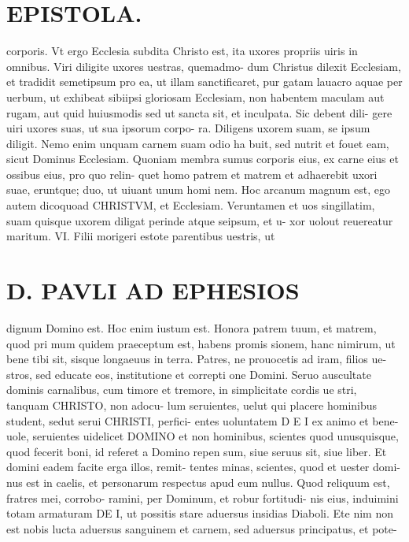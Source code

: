 \documentclass{article}
\begin{document}
\begin{pages}
\section*{EPISTOLA. }
\marginpar{[ p.2 ]}
\marginpar{[ p.10.  ]}
\marginpar{[ p.11.  ]}\pstart corporis. Vt ergo Ecclesia subdita Christo est, ita uxores propriis uiris in omnibus.  \pend\pstart Viri diligite uxores uestras, quemadmo- dum Christus dilexit Ecclesiam, et tradidit semetipsum pro ea, ut illam sanctificaret, pur gatam lauacro aquae per uerbum, ut exhibeat sibiipsi gloriosam Ecclesiam, non habentem maculam aut rugam, aut quid huiusmodis sed ut sancta sit, et inculpata. Sic debent dili- gere uiri uxores suas, ut sua ipsorum corpo- ra. Diligens uxorem suam, se ipsum diligit. Nemo enim unquam carnem suam odio ha buit, sed nutrit et fouet eam, sicut Dominus Ecclesiam.  \pend\pstart Quoniam membra sumus corporis eius, ex carne eius et ossibus eius, pro quo relin- quet homo patrem et matrem et adhaerebit uxori suae, eruntque; duo, ut uiuant unum homi nem. Hoc arcanum magnum est, ego autem dicoquoad CHRISTVM, et Ecclesiam. Veruntamen et uos singillatim, suam quisque uxorem diligat perinde atque seipsum, et u- xor uolout reuereatur maritum.  \pendCAPVT VI. \pstart Filii morigeri estote parentibus uestris, ut  \pend
\section*{D. PAVLI AD EPHESIOS }
\marginpar{[ p.]}
\marginpar{[ p.]}
\marginpar{[ p.]}
\marginpar{[ p.]}\pstart dignum Domino est. Hoc enim iustum est. Honora patrem tuum, et matrem, quod pri mum quidem praeceptum est, habens promis sionem, hanc nimirum, ut bene tibi sit, sisque longaeuus in terra.  \pend\pstart Patres, ne prouocetis ad iram, filios ue- stros, sed educate eos, institutione et correpti one Domini.  \pend\pstart Seruo auscultate dominis carnalibus, cum timore et tremore, in simplicitate cordis ue stri, tanquam CHRISTO, non adocu- lum seruientes, uelut qui placere hominibus student, sedut serui CHRISTI, perfici- entes uoluntatem D E I ex animo et bene- uole, seruientes uidelicet DOMINO et non hominibus, scientes quod unusquisque, quod fecerit boni, id referet a Domino repen sum, siue seruus sit, siue liber.  \pend\pstart Et domini eadem facite erga illos, remit- tentes minas, scientes, quod et uester domi- nus est in caelis, et personarum respectus apud eum nullus.  \pend\pstart Quod reliquum est, fratres mei, corrobo- ramini, per Dominum, et robur fortitudi- nis eius, induimini totam armaturam DE I, ut possitis stare aduersus insidias Diaboli. Ete nim non est nobis lucta aduersus sanguinem et carnem, sed aduersus principatus, et pote-  \pend

\end{pages}
\end{document}
